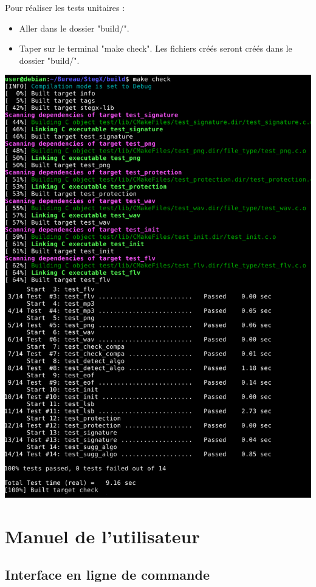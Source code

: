 \documentclass[11pt]{article}
\begin{document}
Pour réaliser les tests unitaires : 
\begin{itemize}
\item Aller dans le dossier "build/".
\item Taper sur le terminal "make check". Les fichiers créés seront créés 
dans le dossier "build/". 
\end{itemize}
\vspace{0.5cm}
\hspace{3cm}
\includegraphics[scale=0.45]{pictures/check.png}
\vspace{1cm}

\section{Manuel de l'utilisateur}

\subsection{Interface en ligne de commande}
\end{document}
